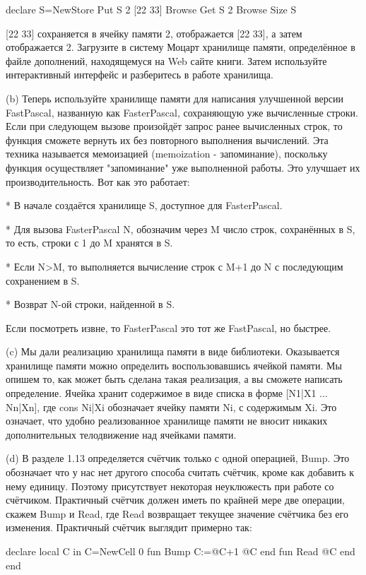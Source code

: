 declare
S={NewStore}
{Put S 2 [22 33]}
{Browse {Get S 2}}
{Browse {Size S}}

[22 33] сохраняется в ячейку памяти 2, отображается [22 33], а затем отображается 2. Загрузите в систему Моцарт хранилище памяти, определённое в файле дополнений, находящемуся на Web сайте книги. Затем используйте интерактивный интерфейс и разберитесь в работе хранилища.

(b) Теперь используйте хранилище памяти для написания улучшенной версии FastPascal, названную как FasterPascal, сохраняющую уже вычисленные строки. Если при следующем вызове произойдёт запрос ранее вычисленных строк, то функция сможете вернуть их без повторного выполнения вычислений. Эта техника называется мемоизацией (memoization - запоминание), поскольку функция осуществляет "запоминание" уже выполненной работы. Это улучшает их производительность. Вот как это работает:

* В начале создаётся хранилище S, доступное для FasterPascal.

* Для вызова {FasterPascal N}, обозначим через M число строк, сохранённых в S, то есть, строки с 1 до M хранятся в S.

* Если N>M, то выполняется вычисление строк с M+1 до N с последующим сохранением в S.

* Возврат N-ой строки, найденной в S.

Если посмотреть извне, то FasterPascal это тот же FastPascal, но быстрее.

(c) Мы дали реализацию хранилища памяти в виде библиотеки. Оказывается хранилище памяти можно определить воспользовавшись ячейкой памяти. Мы опишем то, как может быть сделана такая реализация, а вы сможете написать определение. Ячейка хранит содержимое в виде списка в форме [N1|X1 ... Nn|Xn], где cons Ni|Xi обозначает ячейку памяти Ni, с содержимым Xi. Это означает, что удобно реализованное хранилище памяти не вносит никаких дополнительных телодвижение над ячейками памяти.

(d) В разделе 1.13 определяется счётчик только с одной операцией, Bump. Это обозначает что у нас нет другого способа считать счётчик, кроме как добавить к нему единицу. Поэтому присутствует некоторая неуклюжесть при работе со счётчиком. Практичный счётчик должен иметь по крайней мере две операции, скажем Bump и Read, где Read возвращает текущее значение счётчика без его изменения. Практичный счётчик выглядит примерно так:

declare
local C in
C={NewCell 0}
fun {Bump}
C:=@C+1
@C
end
fun {Read}
@C
end
end

